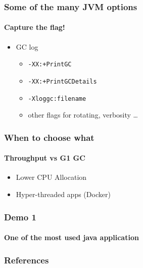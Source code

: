 \documentclass{beamer}
\begin{document}
\begin{frame}
    \frametitle{Some of the many JVM options}
    \framesubtitle{Capture the flag!}
    \begin{itemize}
        \item GC log 
        \begin{itemize}
            \item \texttt{-XX:+PrintGC} 
            \item \texttt{-XX:+PrintGCDetails}
            \item \texttt{-Xloggc:filename}
            \item other flags for rotating, verbosity \dots
        \end{itemize}
    \end{itemize}
\end{frame}


\begin{frame}
    \frametitle{When to choose what}
    \framesubtitle{Throughput vs G1 GC}
    \begin{itemize}
        \item Lower CPU Allocation
        \item Hyper-threaded apps (Docker)
    \end{itemize}
\end{frame}


\begin{frame}
    \frametitle{Demo 1}
    \framesubtitle{One of the most used java application}
\end{frame}


\begin{frame}
    \frametitle{References}
   
\end{frame}
\end{document}
